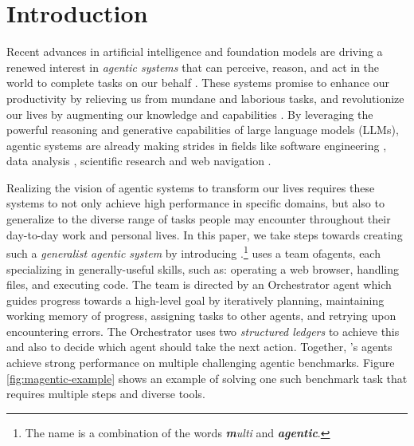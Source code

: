 \section{Introduction}

Recent advances in artificial intelligence and foundation models are driving a renewed interest in \emph{agentic systems} that can perceive, reason, and act in the world to complete tasks on our behalf \cite{russellnorvig1996, Wooldridge1995}. These systems promise to enhance our productivity by relieving us from mundane and laborious tasks, and revolutionize our lives by augmenting our knowledge and capabilities \cite{Jennings1998Applications,Wang2023survey, cheng2024exploring}. 
By leveraging the powerful reasoning and generative capabilities of large language models (LLMs), agentic systems are already making strides in fields like software engineering  \cite{yang2024swe,wang2024opendevinopenplatformai}, data analysis \cite{cao2024spider2vfarmultimodalagents}, scientific research \cite{lu2024ai,d2024marg} and web navigation \cite{zhou2024webarenarealisticwebenvironment,zhang2024webpilotversatileautonomousmultiagent}. 


Realizing the vision of agentic systems to transform our lives requires these systems to not only achieve high performance in specific domains, but also to generalize to the diverse range of tasks people may encounter throughout their day-to-day work and personal lives. In this paper, we take steps towards creating such a \emph{generalist agentic system} by introducing \emph{\team}.\footnote{The name \team{} is a combination of the words \textit{\textbf{m}ulti} and \textit{\textbf{agentic}}.} \team uses a team ofagents, each specializing in generally-useful skills, such as: operating a web browser, handling files, and executing code. The team is directed by an Orchestrator agent which guides progress towards a high-level goal by iteratively planning, maintaining working memory of progress, assigning tasks to other agents, and retrying upon encountering errors. The Orchestrator uses two \emph{structured ledgers} to achieve this and also to decide which agent should take the next action. 
Together, \team{}'s agents achieve strong performance on multiple challenging agentic benchmarks. 
Figure \ref{fig:magentic-example} shows an example of \team solving one such benchmark task that requires multiple steps and diverse tools. 

